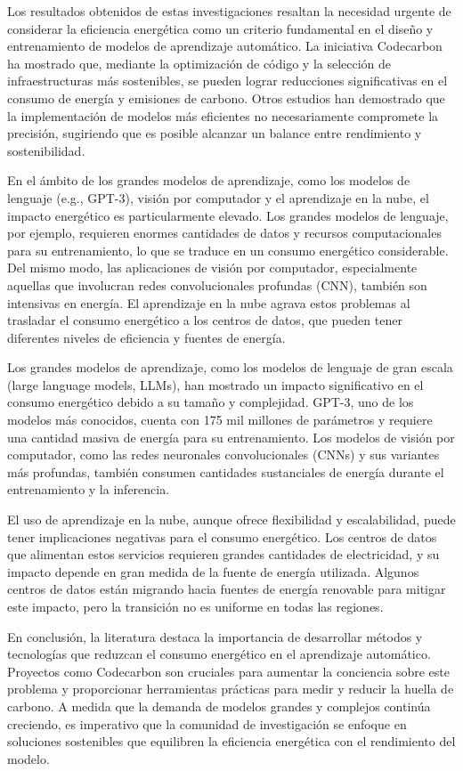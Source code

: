 Los resultados obtenidos de estas investigaciones resaltan la necesidad urgente de considerar la eficiencia energética como un criterio fundamental en el diseño y entrenamiento de modelos de aprendizaje automático. La iniciativa Codecarbon ha mostrado que, mediante la optimización de código y la selección de infraestructuras más sostenibles, se pueden lograr reducciones significativas en el consumo de energía y emisiones de carbono. Otros estudios han demostrado que la implementación de modelos más eficientes no necesariamente compromete la precisión, sugiriendo que es posible alcanzar un balance entre rendimiento y sostenibilidad.

En el ámbito de los grandes modelos de aprendizaje, como los modelos de lenguaje (e.g., GPT-3), visión por computador y el aprendizaje en la nube, el impacto energético es particularmente elevado. Los grandes modelos de lenguaje, por ejemplo, requieren enormes cantidades de datos y recursos computacionales para su entrenamiento, lo que se traduce en un consumo energético considerable. Del mismo modo, las aplicaciones de visión por computador, especialmente aquellas que involucran redes convolucionales profundas (CNN), también son intensivas en energía. El aprendizaje en la nube agrava estos problemas al trasladar el consumo energético a los centros de datos, que pueden tener diferentes niveles de eficiencia y fuentes de energía.

Los grandes modelos de aprendizaje, como los modelos de lenguaje de gran escala (large language models, LLMs), han mostrado un impacto significativo en el consumo energético debido a su tamaño y complejidad. GPT-3, uno de los modelos más conocidos, cuenta con 175 mil millones de parámetros y requiere una cantidad masiva de energía para su entrenamiento. Los modelos de visión por computador, como las redes neuronales convolucionales (CNNs) y sus variantes más profundas, también consumen cantidades sustanciales de energía durante el entrenamiento y la inferencia.

El uso de aprendizaje en la nube, aunque ofrece flexibilidad y escalabilidad, puede tener implicaciones negativas para el consumo energético. Los centros de datos que alimentan estos servicios requieren grandes cantidades de electricidad, y su impacto depende en gran medida de la fuente de energía utilizada. Algunos centros de datos están migrando hacia fuentes de energía renovable para mitigar este impacto, pero la transición no es uniforme en todas las regiones.

En conclusión, la literatura destaca la importancia de desarrollar métodos y tecnologías que reduzcan el consumo energético en el aprendizaje automático. Proyectos como Codecarbon son cruciales para aumentar la conciencia sobre este problema y proporcionar herramientas prácticas para medir y reducir la huella de carbono. A medida que la demanda de modelos grandes y complejos continúa creciendo, es imperativo que la comunidad de investigación se enfoque en soluciones sostenibles que equilibren la eficiencia energética con el rendimiento del modelo.

